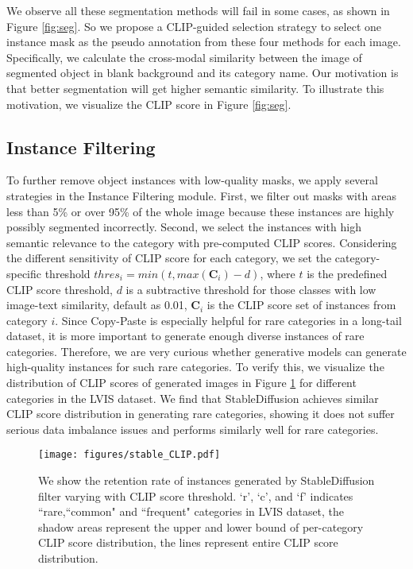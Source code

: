 \documentclass{article}
\begin{document}
We observe all these segmentation methods will fail in some cases, as shown in Figure \ref{fig:seg}. So we propose a CLIP-guided selection strategy to select one instance mask as the pseudo annotation from these four methods for each image. Specifically, we calculate the cross-modal similarity between the image of segmented object in blank background and its category name. Our motivation is that better segmentation will get higher semantic similarity. To illustrate this motivation, we visualize the CLIP score in Figure \ref{fig:seg}. 


\subsection{Instance Filtering}
To further remove object instances with low-quality masks, we apply several strategies in the Instance Filtering module. First, we filter out masks with areas less than 5\% or over 95\% of the whole image because these instances are highly possibly segmented incorrectly. Second, we select the instances with high semantic relevance to the category with pre-computed CLIP scores. Considering the different sensitivity of CLIP score for each category, we set the category-specific threshold $thres_i=min(t,max(\mathbf{C}_i)-d)$, where $t$ is the predefined CLIP score threshold, $d$ is a subtractive threshold for those classes with low image-text similarity, default as 0.01, $\mathbf{C}_i$ is the CLIP score set of instances from category $i$. Since Copy-Paste is especially helpful for rare categories in a long-tail dataset, it is more important to generate enough diverse instances of rare categories. Therefore, we are very curious whether generative models can generate high-quality instances for such rare categories. To verify this, we visualize the distribution of CLIP scores of generated images in Figure \ref{fig:stable_CLIP} for different categories in the LVIS dataset. We find that StableDiffusion achieves similar CLIP score distribution in generating rare categories, showing it does not suffer serious data imbalance issues and performs similarly well for rare categories.


\begin{figure}
   \centering
   \texttt{[image: figures/stable\_CLIP.pdf]}
\caption{We show the retention rate of instances generated by StableDiffusion filter varying with CLIP score threshold. `r', `c', and `f' indicates ``rare,``common" and ``frequent" categories in LVIS dataset, the shadow areas represent the upper and lower bound of per-category CLIP score distribution, the lines represent entire CLIP score distribution.}\vspace{-1em}
   \label{fig:stable_CLIP}
 \end{figure}
\end{document}
